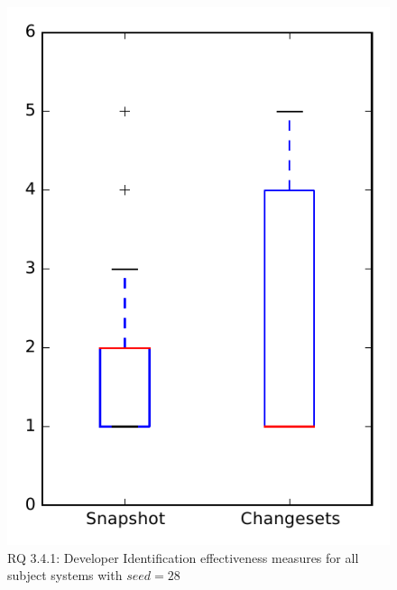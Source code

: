 
\begin{figure}
\centering
\includegraphics[height=0.4\textheight]{figures/dit_seed/rq1_overview_28}
\caption{RQ 3.4.1: Developer Identification effectiveness measures for all subject systems with $seed=28$}
\label{fig:dit_seed:rq1:overview}
\end{figure}

